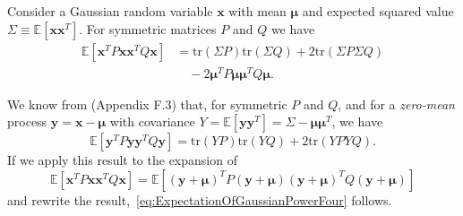 \documentclass[twocolumn]{autart}
\newcommand{\ve}[1]{{\boldsymbol{#1}}} \newcommand{\tr}{\mbox{tr}} \newcommand{\ex}{\mathds{E}} \newcommand{\va}{\mathds{V}}
\begin{document}
\begin{thm}\label{th:ExpectationOfGaussianPowerFour}
Consider a Gaussian random variable $\ve{x}$ with mean $\ve{\mu}$ and expected squared value $\Sigma \equiv \ex[\ve{x}\ve{x}^T]$. For symmetric matrices $P$ and $Q$ we have
\begin{align}
\ex[\ve{x}^T P \ve{x} \ve{x}^T Q \ve{x}] & = \tr(\Sigma P)\tr(\Sigma Q) + 2\tr(\Sigma P \Sigma Q) \nonumber \\
& \hspace{12pt} - 2\ve{\mu}^T P \ve{\mu} \ve{\mu}^T Q \ve{\mu}. \label{eq:ExpectationOfGaussianPowerFour}
\end{align}
\end{thm}
\begin{pf}
We know from \cite{SCEMBook} (Appendix F.3) that, for symmetric $P$ and $Q$, and for a \emph{zero-mean} process $\ve{y} = \ve{x} - \ve{\mu}$ with covariance $Y = \ex[\ve{y}\ve{y}^T] = \Sigma - \ve{\mu}\ve{\mu}^T$, we have
\begin{equation}\label{eq:ExpectationOfPowerFourZeroMean}
\ex[\ve{y}^T P \ve{y} \ve{y}^T Q \ve{y}] = \tr(Y P)\tr(Y Q) + 2\tr(Y P Y Q).
\end{equation}
If we apply this result to the expansion of
\begin{equation}
\ex[\ve{x}^T P \ve{x} \ve{x}^T Q \ve{x}] = \ex[(\ve{y} + \ve{\mu})^T P (\ve{y} + \ve{\mu}) (\ve{y} + \ve{\mu})^T Q (\ve{y} + \ve{\mu})]
\end{equation}
and rewrite the result,~\eqref{eq:ExpectationOfGaussianPowerFour} follows.
\end{pf}
\end{document}
